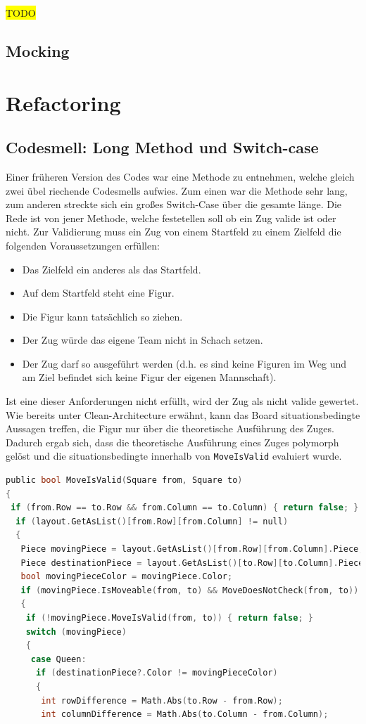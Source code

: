 \documentclass[
10pt, %
a4paper, %
oneside, %
headinclude,footinclude, %
BCOR5mm, %
]{scrartcl}
\begin{document}
\begin{onehalfspace}
\colorbox{yellow}{TODO}
\subsection{Mocking}
\newpage
\section{Refactoring}
\subsection{Codesmell: Long Method und Switch-case}
Einer früheren Version des Codes war eine Methode zu entnehmen, welche gleich zwei übel riechende Codesmells aufwies. Zum einen war die Methode sehr lang, zum anderen streckte sich ein großes Switch-Case über die gesamte länge. Die Rede ist von jener Methode, welche festetellen soll ob ein Zug valide ist oder nicht. Zur Validierung muss ein Zug von einem Startfeld zu einem Zielfeld die folgenden Voraussetzungen erfüllen:
\begin{center}
	\begin{itemize}
		\item Das Zielfeld ein anderes als das Startfeld.
		\item Auf dem Startfeld steht eine Figur.
		\item Die Figur kann tatsächlich so ziehen.
		\item Der Zug würde das eigene Team nicht in Schach setzen.
		\item Der Zug darf so ausgeführt werden (d.h. es sind keine Figuren im Weg und am Ziel befindet sich keine Figur der eigenen Mannschaft).
	\end{itemize}
\end{center}
Ist eine dieser Anforderungen nicht erfüllt, wird der Zug als nicht valide gewertet. Wie bereits unter Clean-Architecture erwähnt, kann das Board situationsbedingte Aussagen treffen, die Figur nur über die theoretische Ausführung des Zuges. Dadurch ergab sich, dass die theoretische Ausführung eines Zuges polymorph gelöst und die situationsbedingte innerhalb von \texttt{MoveIsValid} evaluiert wurde. 
\vspace{0.5cm}

\begin{lstlisting}[language=c, style=mStyle]
public bool MoveIsValid(Square from, Square to)
{
 if (from.Row == to.Row && from.Column == to.Column) { return false; }
  if (layout.GetAsList()[from.Row][from.Column] != null)
  {
   Piece movingPiece = layout.GetAsList()[from.Row][from.Column].Piece;
   Piece destinationPiece = layout.GetAsList()[to.Row][to.Column].Piece;
   bool movingPieceColor = movingPiece.Color;
   if (movingPiece.IsMoveable(from, to) && MoveDoesNotCheck(from, to))
   {
	if (!movingPiece.MoveIsValid(from, to)) { return false; }
	switch (movingPiece)
	{
	 case Queen:
	  if (destinationPiece?.Color != movingPieceColor)
	  {
	   int rowDifference = Math.Abs(to.Row - from.Row);
	   int columnDifference = Math.Abs(to.Column - from.Column);


\end{lstlisting}
\end{onehalfspace}
\end{document}
